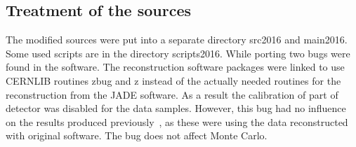 \subsection{Treatment of the sources}
The modified  sources were put into a separate directory src2016 and main2016.
Some used scripts are in the directory scripts2016.
 While porting two bugs were found in the software.
 The reconstruction software packages were linked to use CERNLIB routines zbug and z  instead of the actually needed routines for the reconstruction
 from the JADE software. As a result the calibration of part of detector was disabled for the data samples.
 However, this bug had no influence on the results produced previously~\cite{Schieck:2012mp}, as these were using the 
 data reconstructed with original software. The bug does not affect Monte Carlo.

